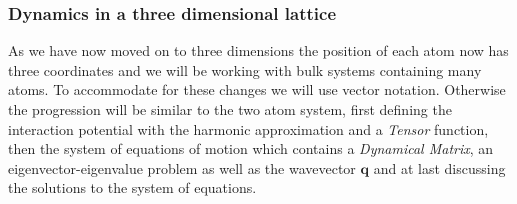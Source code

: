\subsubsection{Dynamics in a three dimensional lattice} As we have now moved on to three dimensions the position of each atom now has three coordinates and we will be working with bulk systems containing many atoms. To accommodate for these changes we will use vector notation. Otherwise the progression will be similar to the two atom system, first defining the interaction potential with the harmonic approximation and a \textit{Tensor} function, then the system of equations of motion which contains a \textit{Dynamical Matrix}, an eigenvector-eigenvalue problem as well as the wavevector $\textbf{q}$ and at last discussing the solutions to the system of equations.\\
